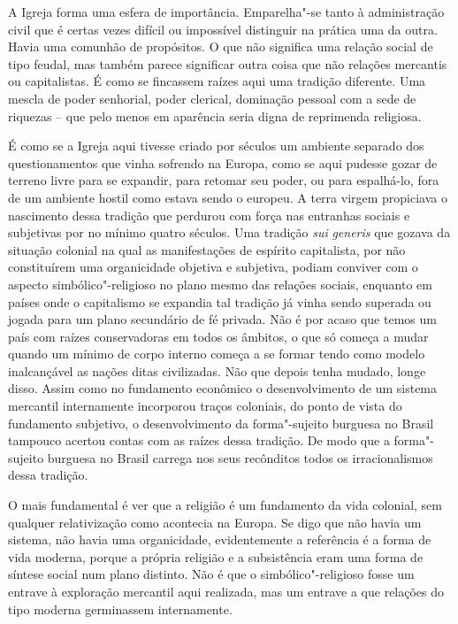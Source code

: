 A Igreja forma uma esfera de importância. Emparelha"-se tanto à
administração civil que é certas vezes difícil ou impossível distinguir
na prática uma da outra. Havia uma comunhão de propósitos. O que não
significa uma relação social de tipo feudal, mas também parece
significar outra coisa que não relações mercantis ou capitalistas. É
como se fincassem raízes aqui uma tradição diferente. Uma mescla de
poder senhorial, poder clerical, dominação pessoal com a sede de
riquezas -- que pelo menos em aparência seria digna de reprimenda
religiosa.

É como se a Igreja aqui tivesse criado por séculos um ambiente separado
dos questionamentos que vinha sofrendo na Europa, como se aqui pudesse
gozar de terreno livre para se expandir, para retomar seu poder, ou para
espalhá-lo, fora de um ambiente hostil como estava sendo o europeu. A
terra virgem propiciava o nascimento dessa tradição que perdurou com
força nas entranhas sociais e subjetivas por no mínimo quatro séculos.
Uma tradição \emph{sui} \emph{generis} que gozava da situação colonial
na qual as manifestações de espírito capitalista, por não constituírem
uma organicidade objetiva e subjetiva, podiam conviver com o aspecto
simbólico"-religioso no plano mesmo das relações sociais, enquanto em
países onde o capitalismo se expandia tal tradição já vinha sendo
superada ou jogada para um plano secundário de fé privada. Não é por
acaso que temos um país com raízes conservadoras em todos os âmbitos, o
que só começa a mudar quando um mínimo de corpo interno começa a se
formar tendo como modelo inalcançável as nações ditas civilizadas. Não
que depois tenha mudado, longe disso. Assim como no fundamento econômico
o desenvolvimento de um sistema mercantil internamente incorporou traços
coloniais, do ponto de vista do fundamento subjetivo, o desenvolvimento
da forma"-sujeito burguesa no Brasil tampouco acertou contas com as
raízes dessa tradição. De modo que a forma"-sujeito burguesa no Brasil
carrega nos seus recônditos todos os irracionalismos dessa tradição.

O mais fundamental é ver que a religião é um fundamento da vida
colonial, sem qualquer relativização como acontecia na Europa. Se
digo que não havia um sistema, não havia uma organicidade,
evidentemente a referência é a forma de vida moderna, porque a própria
religião e a subsistência eram uma forma de síntese social num plano
distinto. Não é que o simbólico"-religioso fosse um entrave à exploração
mercantil aqui realizada, mas um entrave a que relações do tipo moderna
germinassem internamente.

